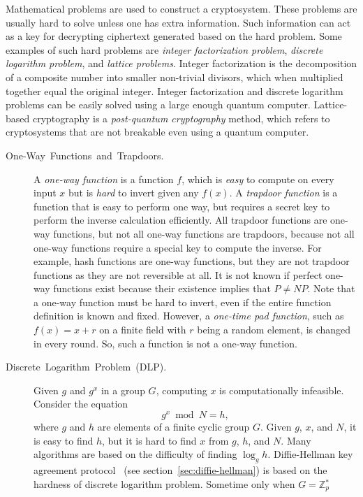 \documentclass[10pt]{article}
\theoremstyle{plain}
\begin{document}
Mathematical problems are used to construct a cryptosystem. These
problems are usually hard to solve unless one has extra information.
Such information can act as a key for decrypting ciphertext generated
based on the hard problem. Some examples of such hard problems are
\emph{integer factorization problem}, \emph{discrete logarithm problem},
and \emph{lattice problems}. Integer factorization is the decomposition
of a composite number into smaller non-trivial divisors, which when
multiplied together equal the original integer. Integer factorization
and discrete logarithm problems can be easily solved using a large
enough quantum computer. Lattice-based cryptography is a \emph{post-quantum
	cryptography} method, which refers to cryptosystems that are not breakable
even using a quantum computer.
\begin{description}
	\item [{One-Way~Functions~and~Trapdoors.\label{sec:One-Way-Functions}}] A
	\emph{one-way function} is a function $f$, which is \emph{easy} to
	compute on every input $x$ but is \emph{hard} to invert given any
	$f(x)$. A \emph{trapdoor function} is a function that is easy to
	perform one way, but requires a secret key to perform the inverse
	calculation efficiently. All trapdoor functions are one-way functions,
	but not all one-way functions are trapdoors, because not all one-way
	functions require a special key to compute the inverse. For example,
	hash functions are one-way functions, but they are not trapdoor functions
	as they are not reversible at all. It is not known if perfect one-way
	functions exist because their existence implies that $P\neq NP$.
	Note that a one-way function must be hard to invert, even if the entire
	function definition is known and fixed. However, a \emph{one-time
		pad function}, such as $f(x)=x+r$ on a finite field with $r$ being
	a random element, is changed in every round. So, such a function is
	not a one-way function.
	\item [{Discrete~Logarithm~Problem~(DLP).}] Given $g$ and $g^{x}$
	in a group $G$, computing $x$ is computationally infeasible. Consider
	the equation 
	\[
	g^{x}\bmod{N}=h,
	\]
	where $g$ and $h$ are elements of a finite cyclic group $G$. Given
	$g$, $x$, and $N$, it is easy to find $h$, but it is hard to find
	$x$ from $g$, $h$, and $N$. Many algorithms are based on the difficulty
	of finding $\log_{g}{h}$. Diffie-Hellman key agreement protocol~\cite{Diffie:2006:NDC:2263321.2269104}
	(see section~\ref{sec:diffie-hellman}) is based on the hardness
	of discrete logarithm problem. Sometime only when $G=\mathbb{Z}{}_{p}^{*}$

\end{description}
\end{document}

